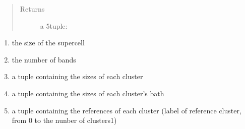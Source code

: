 \documentclass[letterpaper,10pt,english]{sphinxmanual}
\begin{document}
\begin{fulllineitems}
\label{\detokenize{functions:pyqcm.model_size}}\begin{quote}\begin{description}
\item[{Returns}] \leavevmode
\sphinxAtStartPar
a 5\sphinxhyphen{}tuple:

\end{description}\end{quote}
\begin{enumerate}
%
\item {} 
\sphinxAtStartPar
the size of the supercell

\item {} 
\sphinxAtStartPar
the number of bands

\item {} 
\sphinxAtStartPar
a tuple containing the sizes of each cluster

\item {} 
\sphinxAtStartPar
a tuple containing the sizes of each cluster’s bath

\item {} 
\sphinxAtStartPar
a tuple containing the references of each cluster (label of reference cluster, from 0 to the nunber of clusters\sphinxhyphen{}1)

\end{enumerate}

\end{fulllineitems}

\end{document}
